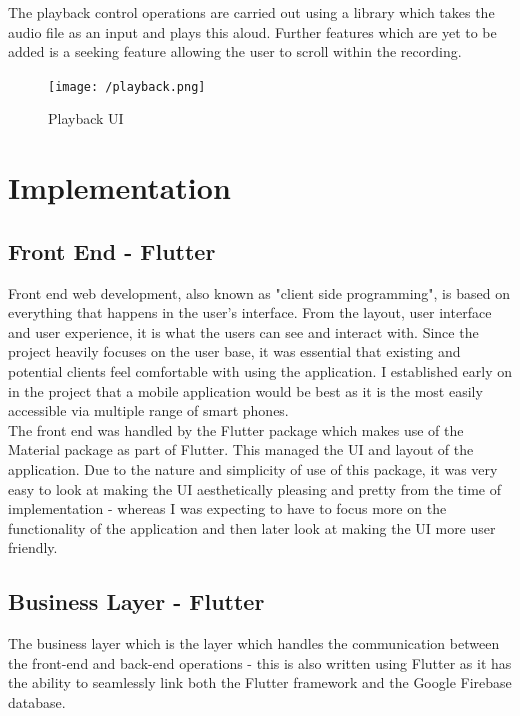 \documentclass[oneside]{report}
\begin{document}
The playback control operations are carried out using a library which takes the audio file as an input and plays this aloud. Further features which are yet to be added is a seeking feature allowing the user to scroll within the recording.

			\begin{figure}[H]
				\begin{center}
		 		 	\texttt{[image: /playback.png]}
				\end{center}
				\caption[Playback UI]{Playback UI}
			\end{figure}

\chapter{Implementation}
	\section{Front End - Flutter}
	 Front end web development, also known as "client side programming", is based on everything that happens in the user's interface. From the layout, user interface and user experience, it is what the users can see and interact with. Since the project heavily focuses on the user base, it was essential that existing and potential clients feel comfortable with using the application. I established early on in the project that a mobile application would be best as it is the most easily accessible via multiple range of smart phones.\\
	
	The front end was handled by the Flutter package which makes use of the Material package as part of Flutter. This managed the UI and layout of the application. Due to the nature and simplicity of use of this package, it was very easy to look at making the UI aesthetically pleasing and pretty from the time of implementation - whereas I was expecting to have to focus more on the functionality of the application and then later look at making the UI more user friendly.

	\section{Business Layer - Flutter}
	The business layer which is the layer which handles the communication between the front-end and back-end operations - this is also written using Flutter as it has the ability to seamlessly link both the Flutter framework and the Google Firebase database. \\
	
\end{document}
